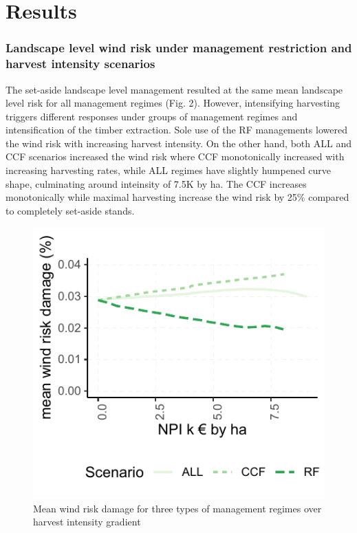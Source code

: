 \documentclass[]{elsarticle} %
\makeatletter
\def\maxwidth{\ifdim\Gin@nat@width>\linewidth\linewidth
\else\Gin@nat@width\fi}
\let\Oldincludegraphics\includegraphics
\renewcommand{\includegraphics}[1]{\Oldincludegraphics[width=\maxwidth]{#1}}
\makeatother
\begin{document}
\section{Results}\label{results}

\subsubsection{Landscape level wind risk under management restriction
and harvest intensity
scenarios}\label{landscape-level-wind-risk-under-management-restriction-and-harvest-intensity-scenarios}

The set-aside landscape level management resulted at the same mean
landscape level risk for all management regimes (Fig. 2). However,
intensifying harvesting triggers different responses under groups of
management regimes and intensification of the timber extraction. Sole
use of the RF managements lowered the wind risk with increasing harvest
intensity. On the other hand, both ALL and CCF scenarios increased the
wind risk where CCF monotonically increased with increasing harvesting
rates, while ALL regimes have slightly humpened curve shape, culminating
around inteinsity of 7.5K by ha. The CCF increases monotonically while
maximal harvesting increase the wind risk by 25\% compared to completely
set-aside stands.

\begin{figure}
\centering
\includegraphics{test_manus_files/figure-latex/fig3_mean_risk_by_intensity_plot-1.pdf}
\caption{Mean wind risk damage for three types of management regimes
over harvest intensity gradient}
\end{figure}
\end{document}
